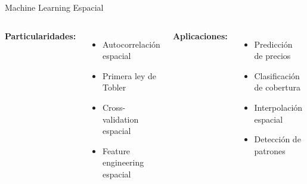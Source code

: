 \documentclass[10pt]{beamer}
\begin{document}
\begin{frame}[fragile]{Machine Learning Espacial}
    \begin{columns}
        \textbf{Particularidades:}
        \begin{itemize}
            \item Autocorrelación espacial
            \item Primera ley de Tobler
            \item Cross-validation espacial
            \item Feature engineering espacial
        \end{itemize}
        
        \textbf{Aplicaciones:}
        \begin{itemize}
            \item Predicción de precios
            \item Clasificación de cobertura
            \item Interpolación espacial
            \item Detección de patrones
        \end{itemize}
        
        \begin{lstlisting}[language=Python, caption=ML con features espaciales]
from sklearn.ensemble import RandomForestRegressor
import geopandas as gpd

# Features espaciales
gdf['dist_centro'] = gdf.distance(centro)
gdf['dist_metro'] = gdf.distance(metro)
gdf['n_vecinos'] = gdf.buffer(500).apply(
    lambda x: puntos.within(x).sum()
)

# Lag espacial
from libpysal.weights import KNN
w = KNN.from_dataframe(gdf, k=5)
gdf['precio_lag'] = w.lag(gdf['precio'])

# Modelo
X = gdf[['area', 'dist_centro', 
         'dist_metro', 'precio_lag']]
y = gdf['precio']

model = RandomForestRegressor()
model.fit(X, y)
        \end{lstlisting}
    \end{columns}
\end{frame}
\end{document}
